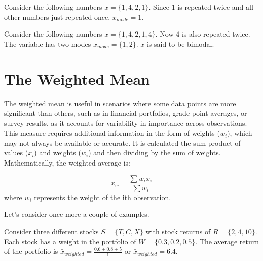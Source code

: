 \documentclass[
  11pt,
  letterpaper,
  DIV=11,
  numbers=noendperiod,
  oneside,
  open=any]{scrreprt}
\begin{document}
\begin{bsexample}[Example 1]

Consider the following numbers \(x=\{1,4,2,1\}\). Since \(1\) is
repeated twice and all other numbers just repeated once, \(x_{mode}=1\).

\end{bsexample}

\begin{bsexample}[Example 2]

Consider the following numbers \(x=\{1,4,2,1,4\}\). Now \(4\) is also
repeated twice. The variable has two modes \(x_{mode}=\{1,2\}\). \(x\)
is said to be bimodal.

\end{bsexample}

\section{The Weighted Mean}\label{the-weighted-mean}

The weighted mean is useful in scenarios where some data points are more
significant than others, such as in financial portfolios, grade point
averages, or survey results, as it accounts for variability in
importance across observations. This measure requires additional
information in the form of weights (\(w_i\)), which may not always be
available or accurate. It is calculated the sum product of values
(\(x_i\)) and weights (\(w_i\)) and then dividing by the sum of weights.
Mathematically, the weighted average is:

\begin{bsformula}

\[\bar{x}_w=\frac{\sum w_{i}x_{i}}{\sum w_{i}}\] where \(w_{i}\)
represents the weight of the ith observation.

\end{bsformula}

Let's consider once more a couple of examples.

\begin{bsexample}[Example 1]

Consider three different stocks \(S=\{T, C, X\}\) with stock returns of
\(R=\{2,4,10\}\). Each stock has a weight in the portfolio of
\(W=\{0.3,0.2,0.5\}\). The average return of the portfolio is
\(\bar{x}_{weighted}=\frac{0.6+0.8+5}{1}\) or
\(\bar{x}_{weighted}=6.4\).

\end{bsexample}
\end{document}
